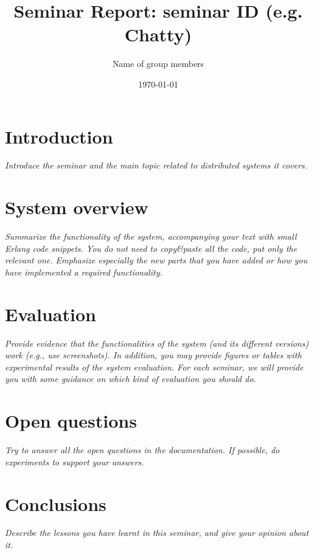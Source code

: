 \documentclass[a4paper, 11pt]{article}
\title{Seminar Report: seminar ID (e.g. Chatty)}
\author{Name of group members}
\date{\today{}}
\begin{document}
\maketitle

\section{Introduction}

\textit{Introduce the seminar and the main topic related to distributed systems it covers.}

\section{System overview}

\textit{Summarize the functionality of the system, accompanying your text with small Erlang code snippets. You do not need to copy\&paste all the code, put only the relevant one. Emphasize especially the new parts that you have added or how you have implemented a required functionality.}

\section{Evaluation}

\textit{Provide evidence that the functionalities of the system (and its different versions) work (e.g., use screenshots). In addition, you may provide figures or tables with experimental results of the system evaluation. For each seminar, we will provide you with some guidance on which kind of evaluation you should do.}

\section{Open questions}

\textit{Try to answer all the open questions in the documentation. If possible, do experiments to support your answers.}

\section{Conclusions}

\textit{Describe the lessons you have learnt in this seminar, and give your opinion about it.}
\end{document}
